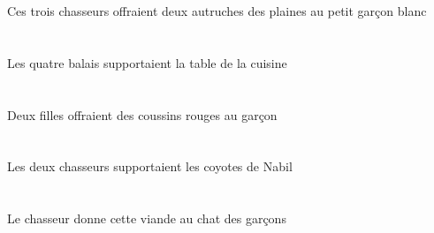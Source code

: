 \begin{exe}
Ces trois chasseurs offraient deux autruches des plaines au petit garçon blanc
\ex\glll
\DEFPlErg{}   \quatreAPl{}   \balaiAPlErg{}   \DEFSgAbs{}    \DEFSgObl{}   \cuisineDSgObl{}   \DE{}   \tableDSgAbs{}  \supporterVtPstDSg{}\\
\DEFPlErgP{}   \quatreAPlP{}   \balaiAPlErgP{}   \DEFSgAbsP{}    \DEFSgOblP{}   \cuisineDSgOblP{}   \DEP{}   \tableDSgAbsP{}  \supporterVtPstDSgP{}\\
\DEFPlErgG{}   \quatreAPlG{}   \balaiAPlErgG{}   \DEFSgAbsG{}    \DEFSgOblG{}   \cuisineDSgOblG{}   \DEG{}   \tableDSgAbsG{}  \supporterVtPstDSgG{}\\
Les quatre balais supportaient la table de la cuisine
\ex\glll
\INDDuErg{}   \filleCDuErg{}    \DEFSgDat{}   \garconDSgDat{}   \INDPlAbs{}   \rougeBPl{}   \coussinBPlAbs{}  \offrirVdPstBPl{}\\
\INDDuErgP{}   \filleCDuErgP{}    \DEFSgDatP{}   \garconDSgDatP{}   \INDPlAbsP{}   \rougeBPlP{}   \coussinBPlAbsP{}  \offrirVdPstBPlP{}\\
\INDDuErgG{}   \filleCDuErgG{}    \DEFSgDatG{}   \garconDSgDatG{}   \INDPlAbsG{}   \rougeBPlG{}   \coussinBPlAbsG{}  \offrirVdPstBPlG{}\\
Deux filles offraient des coussins rouges au garçon
\ex\glll
\DEFDuErg{}   \chasseurCDuErg{}   \DEFPlAbs{}    \INDSgObl{}   \NabilDSgObl{}   \DE{}   \coyoteCPlAbs{}  \supporterVtPstCPl{}\\
\DEFDuErgP{}   \chasseurCDuErgP{}   \DEFPlAbsP{}    \INDSgOblP{}   \NabilDSgOblP{}   \DEP{}   \coyoteCPlAbsP{}  \supporterVtPstCPlP{}\\
\DEFDuErgG{}   \chasseurCDuErgG{}   \DEFPlAbsG{}    \INDSgOblG{}   \NabilDSgOblG{}   \DEG{}   \coyoteCPlAbsG{}  \supporterVtPstCPlG{}\\
Les deux chasseurs supportaient les coyotes de Nabil
\ex\glll
\DEFSgErg{}   \chasseurCSgErg{}    \DEFSgDat{}    \DEFPlObl{}   \garconDPlObl{}   \DE{}   \chatDSgDat{}   \DEMSgAbs{}   \viandeASgAbs{}  \donnerVdPrsASg{}\\
\DEFSgErgP{}   \chasseurCSgErgP{}    \DEFSgDatP{}    \DEFPlOblP{}   \garconDPlOblP{}   \DEP{}   \chatDSgDatP{}   \DEMSgAbsP{}   \viandeASgAbsP{}  \donnerVdPrsASgP{}\\
\DEFSgErgG{}   \chasseurCSgErgG{}    \DEFSgDatG{}    \DEFPlOblG{}   \garconDPlOblG{}   \DEG{}   \chatDSgDatG{}   \DEMSgAbsG{}   \viandeASgAbsG{}  \donnerVdPrsASgG{}\\
Le chasseur donne cette viande au chat des garçons
\ex\glll
\INDSgAbs{}   \sourisBSgAbs{}    \DEFSgObl{}    \INDSgObl{}   \KatishaASgObl{}   \DE{}   \litDSgObl{}   \DANS{}  \arriverViPrsBSg{}\\

\end{exe}
